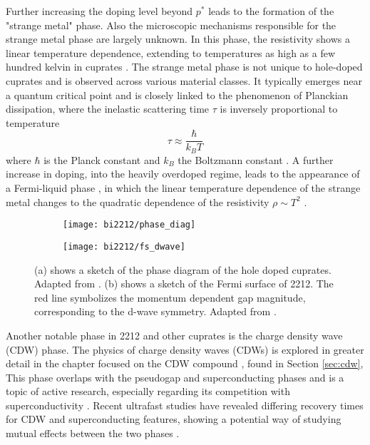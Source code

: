 Further increasing the doping level beyond $p^*$ leads to the formation of the "strange metal" phase.
Also the microscopic mechanisms responsible for the strange metal phase are largely unknown.
In this phase, the resistivity shows a linear temperature dependence, extending to temperatures as high as a few hundred kelvin in cuprates \cite{martin_normal-state_1990, daou_linear_2009, cooper_anomalous_2009}.
The strange metal phase is not unique to hole-doped cuprates and is observed across various material classes.
It typically emerges near a quantum critical point \cite{cooper_anomalous_2009,varma_singular_2002,marel_quantum_2003} and is closely linked to the phenomenon of Planckian dissipation, where the inelastic scattering time $\tau$ is inversely proportional to temperature
\begin{equation}
	\tau \approx \frac{\hbar}{k_BT}
\end{equation}
where $\hbar$ is the Planck constant and $k_B$ the Boltzmann constant \cite{ataei_electrons_2022,bruin_similarity_2013}.
A further increase in doping, into the heavily overdoped regime, leads to the appearance of a Fermi-liquid phase \cite{barisic_evidence_2019}, in which the linear temperature dependence of the strange metal changes to the quadratic dependence of the resistivity $\rho\sim T^2$ \cite{nakamae_electronic_2003,hussey_coherent_2003,plate_fermi_2005}.

\begin{figure}[t]
	\centering
	\begin{subfigure}[b]{0.49\textwidth}
		\texttt{[image: bi2212/phase\_diag]}
		\caption{}
	\end{subfigure}
	\begin{subfigure}[b]{0.45\textwidth}
		\texttt{[image: bi2212/fs\_dwave]}
		\caption{}
	\end{subfigure}
	\caption{(a) shows a sketch of the phase diagram of the hole doped cuprates. Adapted from \cite{keimer_quantum_2015}. (b) shows a sketch of the Fermi surface of 2212. The red line symbolizes the momentum dependent gap magnitude, corresponding to the d-wave symmetry. Adapted from \cite{zhang_photoinduced_2017}.}
	\label{fig:phase_diag}
\end{figure}

Another notable phase in 2212 and other cuprates is the charge density wave (CDW) phase.
The physics of charge density waves (CDWs) is explored in greater detail in the chapter focused on the CDW compound , found in Section \ref{sec:cdw},
This phase overlaps with the pseudogap and superconducting phases and is a topic of active research, especially regarding its competition with superconductivity \cite{arpaia_charge_2021}.
Recent ultrafast studies have revealed differing recovery times for CDW and superconducting features, showing a potential way of studying mutual effects between the two phases \cite{wandel_enhanced_2022}.

